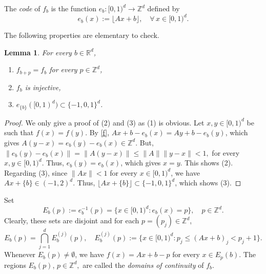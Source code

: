 \documentclass[12pt,reqno,a4paper]{amsart}%
\newtheorem{lemma}{Lemma}
\theoremstyle{definition}
\theoremstyle{remark}
\newcommand{\Rr}{\mathbb{R}}
\newcommand{\Zz}{\mathbb{Z}}
\begin{document}
{{%



The \textit{code} of $f_b$ is the function $e_b\colon [0,1)^d\to\Zz^d$ defined by
\begin{equation}\label{e}
e_b(x):=\lfloor Ax+b\rfloor, \quad \forall\,x\in[0,1)^d.
\end{equation}

The following properties are elementary to check. 
\begin{lemma}\label{lem:elementary} For every $b\in\Rr^d$,
\begin{enumerate}
\item $f_{b+p}=f_b$ for every $p\in\mathbb{Z}^d$,
\item $f_b$ is injective,
\item $e_{\{b\}}([0,1)^d) \subset \{-1,0,1\}^d$.
\end{enumerate}
\end{lemma}
\begin{proof}
We only give a proof of (2) and (3) as (1) is obvious. 
Let $x,y\in [0,1)^d$ {be} such that $f(x)=f(y)$. By \eqref{f}, $Ax+b-e_b(x)=Ay+b-e_b(y)$, which gives $A(y-x)=e_b(y)-e_b(x)\in\Zz^d$. But,
$
\|e_b(y)-e_b(x)\| = \|A(y-x)\|\leq\|A\|\|y-x\|<1,
$ for every $x,y\in[0,1)^d$. Thus, $e_b(y)=e_b(x)$, which gives $x=y$. This shows (2). Regarding (3), since $\|Ax\|<1$ for every $x\in[0,1)^d$, we have $Ax+\{b\}\in(-1,2)^d$. Thus, $\lfloor Ax + \{b\}\rfloor\subset \{-1,0,1\}^d$, which shows (3).
\end{proof}

{Set}
$$
E_b(p):=e_b^{-1}(p) = \{x\in[0,1)^d\colon e_b(x)=p\}, \quad {p \in\Zz^d}.
$$
Clearly, these sets are disjoint and {for each $p=(p_j)\in\mathbb{Z}^d$,}
$$
E_b(p)=\bigcap_{{j=1}}^d E^{{(j)}}_b(p),\quad E^{{(j)}}_b(p):=\{x\in[0,1)^d\colon {p_j}\leq (Ax+b)_{{j}}<{p_j}+1\}.
$$
Whenever $E_b(p)\neq\emptyset$, we have $f(x) = Ax+b-p$ for every $x\in E_p(b)$. The regions $E_b(p)$, ${p\in\Zz^d},$ are called the \textit{domains of continuity} of $f_b$.

}}
\end{document}
